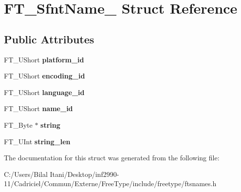 \hypertarget{struct_f_t___sfnt_name__}{}\section{F\+T\+\_\+\+Sfnt\+Name\+\_\+ Struct Reference}
\label{struct_f_t___sfnt_name__}
\subsection*{Public Attributes}
\begin{DoxyCompactItemize}
\item 
F\+T\+\_\+\+U\+Short {\bfseries platform\+\_\+id}\hypertarget{struct_f_t___sfnt_name___ae92450a058eb4737df85f66226d69f43}{}\label{struct_f_t___sfnt_name___ae92450a058eb4737df85f66226d69f43}

\item 
F\+T\+\_\+\+U\+Short {\bfseries encoding\+\_\+id}\hypertarget{struct_f_t___sfnt_name___a01f4573605eab3f4d2e4b9b50b0de98f}{}\label{struct_f_t___sfnt_name___a01f4573605eab3f4d2e4b9b50b0de98f}

\item 
F\+T\+\_\+\+U\+Short {\bfseries language\+\_\+id}\hypertarget{struct_f_t___sfnt_name___a6fb23e0f299a97b25b63805b04cf1fc5}{}\label{struct_f_t___sfnt_name___a6fb23e0f299a97b25b63805b04cf1fc5}

\item 
F\+T\+\_\+\+U\+Short {\bfseries name\+\_\+id}\hypertarget{struct_f_t___sfnt_name___ac07be3e852408990fe0a910f00b68f4e}{}\label{struct_f_t___sfnt_name___ac07be3e852408990fe0a910f00b68f4e}

\item 
F\+T\+\_\+\+Byte $\ast$ {\bfseries string}\hypertarget{struct_f_t___sfnt_name___ab369e2c3d8dc9662f69c53e4d3158067}{}\label{struct_f_t___sfnt_name___ab369e2c3d8dc9662f69c53e4d3158067}

\item 
F\+T\+\_\+\+U\+Int {\bfseries string\+\_\+len}\hypertarget{struct_f_t___sfnt_name___a4ebdb7207b5681d16f9cc17f432cb56f}{}\label{struct_f_t___sfnt_name___a4ebdb7207b5681d16f9cc17f432cb56f}

\end{DoxyCompactItemize}


The documentation for this struct was generated from the following file\+:\begin{DoxyCompactItemize}
\item 
C\+:/\+Users/\+Bilal Itani/\+Desktop/inf2990-\/11/\+Cadriciel/\+Commun/\+Externe/\+Free\+Type/include/freetype/ftsnames.\+h\end{DoxyCompactItemize}
